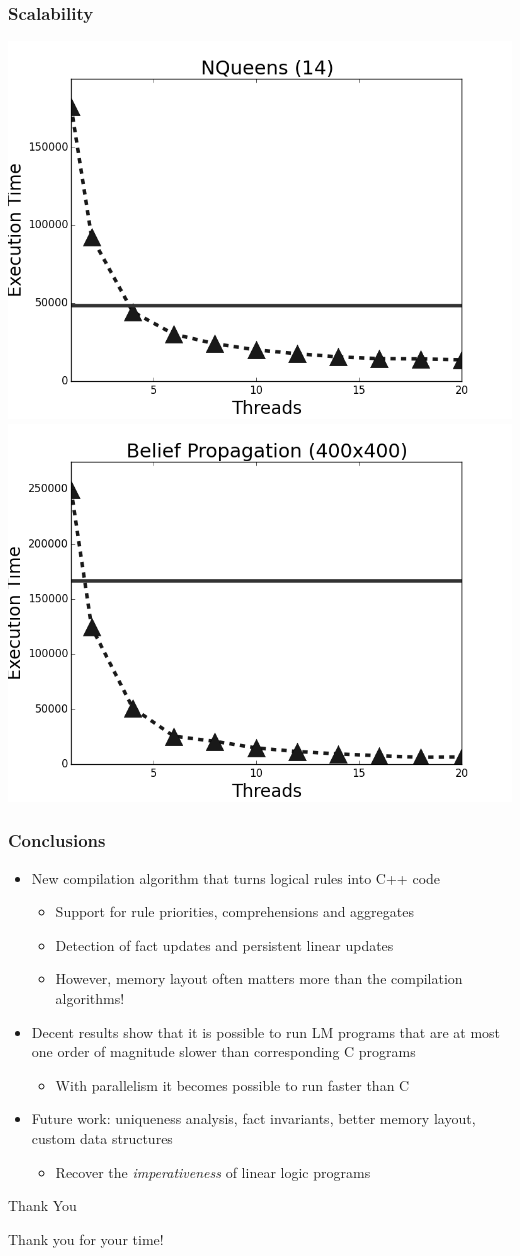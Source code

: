 \documentclass{beamer}
\begin{document}
\frame
{
   \frametitle{Scalability}
   \begin{center}
      \includegraphics[width=0.5\linewidth]{figures/scale-8queens-14.png}
      \includegraphics[width=0.5\linewidth]{figures/scale-belief-propagation-400.png}
   \end{center}
}

\begin{frame}
   \frametitle{Conclusions}
   \begin{itemize}
      \item New compilation algorithm that turns logical rules into C++ code

      \begin{itemize}
         \item Support for rule priorities, comprehensions and aggregates
         \item Detection of fact updates and persistent linear updates
         \item However, memory layout often matters more than the
               compilation algorithms!
      \end{itemize}

      \item Decent results show that it is possible to run LM programs that are
         at most one order of magnitude slower than corresponding C programs

      \begin{itemize}
         \item With parallelism it becomes possible to run faster than C
      \end{itemize}

      \item Future work: uniqueness analysis, fact invariants, better memory
         layout, custom data structures
      \begin{itemize}
         \item Recover the \emph{imperativeness} of linear logic programs
      \end{itemize}
   \end{itemize}
\end{frame}


\begin{frame}{Thank You}
\begin{center}
{\Huge Thank you for your time!}
\end{center}
\end{frame}
\end{document}
